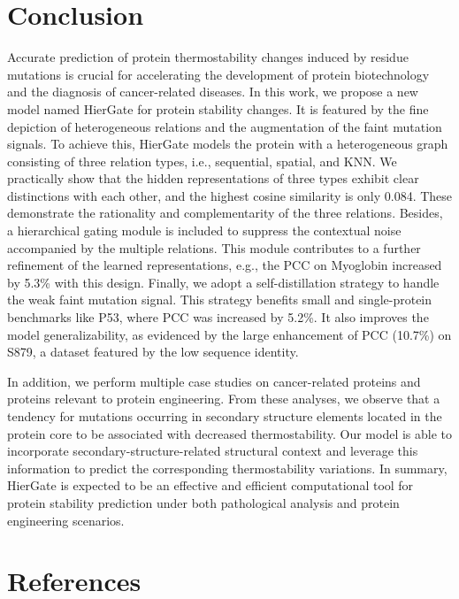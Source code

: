 \documentclass[journal,twoside,web]{ieeecolor}
\begin{document}
\section{Conclusion}
\label{sec:conclusions}

Accurate prediction of protein thermostability changes induced by residue mutations is crucial for accelerating the development of protein biotechnology and the diagnosis of cancer-related diseases. In this work, we propose a new model named HierGate for protein stability changes. It is featured by the fine depiction of heterogeneous relations and the augmentation of the faint mutation signals. To achieve this, HierGate models the protein with a heterogeneous graph consisting of three relation types, i.e., sequential, spatial, and KNN. We practically show that the hidden representations of three types exhibit clear distinctions with each other, and the highest cosine similarity is only 0.084. These demonstrate the rationality and complementarity of the three relations. Besides, a hierarchical gating module is included to suppress the contextual noise accompanied by the multiple relations. This module contributes to a further refinement of the learned representations, e.g., the PCC on Myoglobin increased by 5.3\% with this design. Finally, we adopt a self-distillation strategy to handle the weak faint mutation signal. This strategy benefits small and single-protein benchmarks like P53, where PCC was increased by 5.2\%. It also improves the model generalizability, as evidenced by the large enhancement of PCC (10.7\%) on S879, a dataset featured by the low sequence identity.

In addition, we perform multiple case studies on cancer-related proteins and proteins relevant to protein engineering. From these analyses, we observe that a tendency for mutations occurring in secondary structure elements located in the protein core to be associated with decreased thermostability. Our model is able to incorporate secondary-structure-related structural context and leverage this information to predict the corresponding thermostability variations. In summary, HierGate is expected to be an effective and efficient computational tool for protein stability prediction under both pathological analysis and protein engineering scenarios.


\section*{References}

\end{document}
